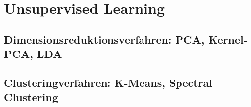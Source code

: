 \section{Unsupervised Learning}

\subsection{Dimensionsreduktionsverfahren: PCA, Kernel-PCA, LDA}

\subsection{Clusteringverfahren: K-Means, Spectral Clustering}